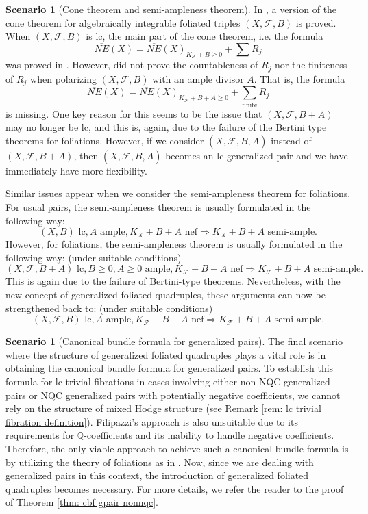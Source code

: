 \documentclass[11pt]{amsart}
\numberwithin{equation}{section}
\newcommand{\Qq}{\mathbb{Q}}
\newcommand{\Ff}{\mathcal{F}}
\theoremstyle{definition}
\theoremstyle{definition}
\newtheorem{sce}[thm]{Scenario}
\theoremstyle{definition}
\begin{document}
\begin{sce}[Cone theorem and semi-ampleness theorem]
In \cite[Theorem 3.9]{ACSS21}, a version of the cone theorem for algebraically integrable foliated triples $(X,\Ff,B)$ is proved. When $(X,\Ff,B)$ is lc, the main part of the cone theorem, i.e. the formula
$$\overline{NE}(X)=\overline{NE}(X)_{K_{\Ff}+B\geq 0}+\sum R_j$$
was proved in  \cite[Theorem 3.9]{ACSS21}. However, \cite[Theorem 3.9]{ACSS21} did not prove the countableness of $R_j$ nor the finiteness of $R_j$ when polarizing $(X,\Ff,B)$ with an ample divisor $A$. That is, the formula
$$\overline{NE}(X)=\overline{NE}(X)_{K_{\Ff}+B+A\geq 0}+\sum_{\text{finite}} R_j$$
is missing. One key reason for this seems to be the issue that $(X,\Ff,B+A)$ may no longer be lc, and this is, again, due to the failure of the Bertini type theorems for foliations. However, if we consider $(X,\Ff,B,\bar A)$ instead of $(X,\Ff,B+A)$, then $(X,\Ff,B,\bar A)$ becomes an lc generalized pair and we have immediately have more flexibility.

Similar issues appear when we consider the semi-ampleness theorem for foliations. For usual pairs, the semi-ampleness theorem is usually formulated in the following way:
$$(X,B) \text{ lc}, A\text{ ample}, K_X+B+A\text{ nef}\Rightarrow K_X+B+A\text{ semi-ample}.$$
However, for foliations, the semi-ampleness theorem is usually formulated in the following way: (under suitable conditions)
$$(X,\Ff,B+A) \text{ lc}, B\geq 0, A\geq 0\text{ ample}, K_{\Ff}+B+A\text{ nef}\Rightarrow K_{\Ff}+B+A\text{ semi-ample}.$$
This is again due to the failure of Bertini-type theorems. Nevertheless, with the new concept of generalized foliated quadruples, these arguments can now be strengthened back to:  (under suitable conditions)
$$(X,\Ff,B) \text{ lc}, A\text{ ample}, K_{\Ff}+B+A\text{ nef}\Rightarrow K_{\Ff}+B+A\text{ semi-ample}.$$
\end{sce}

\begin{sce}[Canonical bundle formula for generalized pairs]
The final scenario where the structure of generalized foliated quadruples plays a vital role is in obtaining the canonical bundle formula for generalized pairs. To establish this formula for lc-trivial fibrations in cases involving either non-NQC generalized pairs or NQC generalized pairs with potentially negative coefficients, we cannot rely on the structure of mixed Hodge structure (see Remark \ref{rem: lc trivial fibration definition}). Filipazzi's approach \cite{Fil19,Fil20} is also unsuitable due to its requirements for $\Qq$-coefficients and its inability to handle negative coefficients. Therefore, the only viable approach to achieve such a canonical bundle formula is by utilizing the theory of foliations as in  \cite{ACSS21}. Now, since we are dealing with generalized pairs in this context, the introduction of generalized foliated quadruples becomes necessary. For more details, we refer the reader to the proof of Theorem \ref{thm: cbf gpair nonnqc}.
\end{sce}
\end{document}
